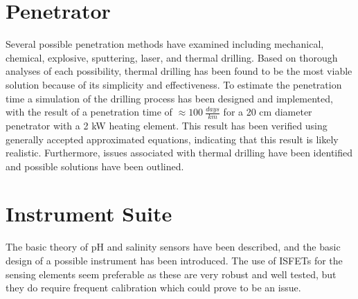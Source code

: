 \section{Penetrator}
Several possible penetration methods have examined including mechanical, chemical, explosive, sputtering, laser, and thermal drilling. Based on thorough analyses of each possibility, thermal drilling has been found to be the most viable solution because of its simplicity and effectiveness. To estimate the penetration time a simulation of the drilling process has been designed and implemented, with the result of a penetration time of $\approx \SI{100}{\frac{days}{km}}$ for a 20 cm diameter penetrator with a 2 kW heating element. This result has been verified using generally accepted approximated equations, indicating that this result is likely realistic. Furthermore, issues associated with thermal drilling have been identified and possible solutions have been outlined.

\section{Instrument Suite}
The basic theory of pH and salinity sensors have been described, and the basic design of a possible instrument has been introduced. The use of ISFETs for the sensing elements seem preferable as these are very robust and well tested, but they do require frequent calibration which could prove to be an issue. 


